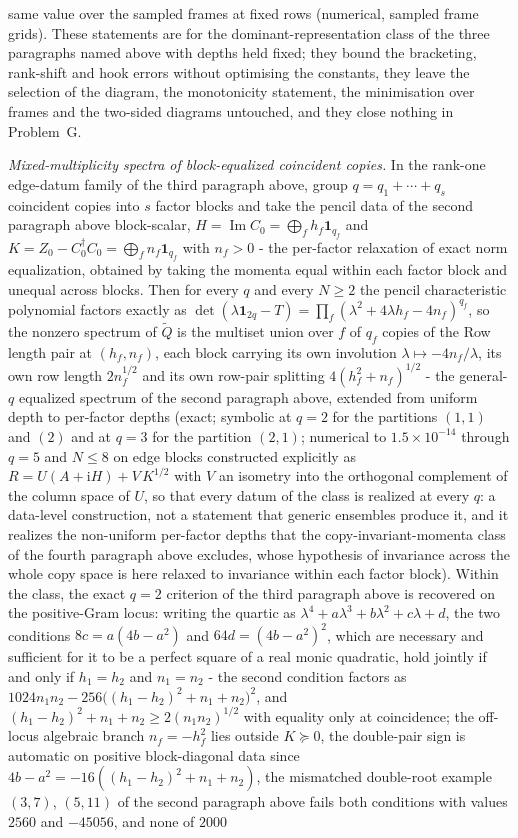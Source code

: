 same value over the sampled frames at fixed rows (numerical, sampled frame grids). These statements are for the dominant-representation class of the three paragraphs named above with depths held fixed; they bound the bracketing, rank-shift and hook errors without optimising the constants, they leave the selection of the diagram, the monotonicity statement, the minimisation over frames and the two-sided diagrams untouched, and they close nothing in Problem~G.

\emph{Mixed-multiplicity spectra of block-equalized coincident copies.} In the rank-one edge-datum family of the third paragraph above, group \(q=q_1+\cdots+q_s\) coincident copies into \(s\) factor blocks and take the pencil data of the second paragraph above block-scalar, \(H=\operatorname{Im}C_0=\bigoplus_f h_f\mathbf 1_{q_f}\) and \(K=Z_0-C_0^\dagger C_0=\bigoplus_f n_f\mathbf 1_{q_f}\) with \(n_f>0\) - the per-factor relaxation of exact norm equalization, obtained by taking the momenta equal within each factor block and unequal across blocks. Then for every \(q\) and every \(N\ge2\) the pencil characteristic polynomial factors exactly as \(\det(\lambda\mathbf 1_{2q}-T)=\prod_f(\lambda^{2}+4\lambda h_f-4n_f)^{q_f}\), so the nonzero spectrum of \(\widetilde Q\) is the multiset union over \(f\) of \(q_f\) copies of the Row length pair at \((h_f,n_f)\), each block carrying its own involution \(\lambda\mapsto-4n_f/\lambda\), its own row length \(2n_f^{1/2}\) and its own row-pair splitting \(4(h_f^{2}+n_f)^{1/2}\) - the general-\(q\) equalized spectrum of the second paragraph above, extended from uniform depth to per-factor depths (exact; symbolic at \(q=2\) for the partitions \((1,1)\) and \((2)\) and at \(q=3\) for the partition \((2,1)\); numerical to \(1.5\times10^{-14}\) through \(q=5\) and \(N\le8\) on edge blocks constructed explicitly as \(R=U(A+\mathrm iH)+V\,K^{1/2}\) with \(V\) an isometry into the orthogonal complement of the column space of \(U\), so that every datum of the class is realized at every \(q\): a data-level construction, not a statement that generic ensembles produce it, and it realizes the non-uniform per-factor depths that the copy-invariant-momenta class of the fourth paragraph above excludes, whose hypothesis of invariance across the whole copy space is here relaxed to invariance within each factor block). Within the class, the exact \(q=2\) criterion of the third paragraph above is recovered on the positive-Gram locus: writing the quartic as \(\lambda^{4}+a\lambda^{3}+b\lambda^{2}+c\lambda+d\), the two conditions \(8c=a(4b-a^{2})\) and \(64d=(4b-a^{2})^{2}\), which are necessary and sufficient for it to be a perfect square of a real monic quadratic, hold jointly if and only if \(h_1=h_2\) and \(n_1=n_2\) - the second condition factors as \(1024n_1n_2-256\bigl((h_1-h_2)^{2}+n_1+n_2\bigr)^{2}\), and \((h_1-h_2)^{2}+n_1+n_2\ge2(n_1n_2)^{1/2}\) with equality only at coincidence; the off-locus algebraic branch \(n_f=-h_f^{2}\) lies outside \(K\succeq0\), the double-pair sign is automatic on positive block-diagonal data since \(4b-a^{2}=-16((h_1-h_2)^{2}+n_1+n_2)\), the mismatched double-root example \((3,7)\), \((5,11)\) of the second paragraph above fails both conditions with values \(2560\) and \(-45056\), and none of \(2000\) 